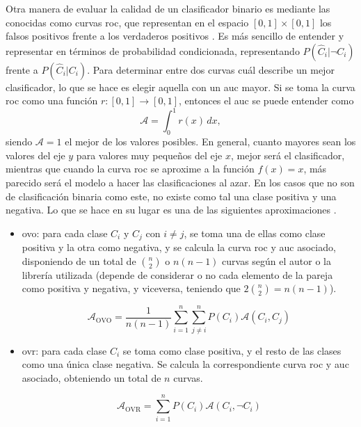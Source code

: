 				Otra manera de evaluar la calidad de un clasificador binario es mediante las conocidas como curvas \gls{roc}, que representan en el espacio $[0, 1]\times[0, 1]$ los falsos positivos frente a los verdaderos positivos \cite{roc}. Es más sencillo de entender y representar en términos de probabilidad condicionada, representando $P(\hat{C}_i | \lnot C_i)$ frente a $P(\hat{C}_i | C_i)$. Para determinar entre dos curvas cuál describe un mejor clasificador, lo que se hace es elegir aquella con un \gls{auc} mayor. Si se toma la curva \gls{roc} como una función $r: [0, 1] \longrightarrow [0, 1]$, entonces el \gls{auc} se puede entender como 
				$$
				\mathcal{A} = \int_0^1 r(x)\,dx, 
				$$
				siendo $\mathcal{A} = 1$ el mejor de los valores posibles. En general, cuanto mayores sean los valores del eje $y$ para valores muy pequeños del eje $x$, mejor será el clasificador, mientras que cuando la curva \gls{roc} se aproxime a la función $f(x) = x$, más parecido será el modelo a hacer las clasificaciones al azar. En los casos que no son de clasificación binaria como este, no existe como tal una clase positiva y una negativa. Lo que se hace en su lugar es una de las siguientes aproximaciones \cite{auc}. 
				
				\begin{itemize}
					\item \gls{ovo}: para cada clase $C_i$ y $C_j$ con $i \neq j$, se toma una de ellas como clase positiva y la otra como negativa, y se calcula la curva \gls{roc} y \gls{auc} asociado, disponiendo de un total de $\binom{n}{2}$ o $n(n-1)$ curvas según el autor o la librería utilizada (depende de considerar o no cada elemento de la pareja como positiva y negativa, y viceversa, teniendo que $2\binom{n}{2} = n(n-1)$). 
					
					$$
					\mathcal{A}_{\text{OVO}} = \frac{1}{n(n-1)}\sum_{i=1}^n\sum_{j \neq i}^n P(C_i)\mathcal{A}(C_i, C_j)
					$$
					
					\item \gls{ovr}: para cada clase $C_i$ se toma como clase positiva, y el resto de las clases como una única clase negativa. Se calcula la correspondiente curva \gls{roc} y \gls{auc} asociado, obteniendo un total de $n$ curvas. 
					
					$$
					\mathcal{A}_{\text{OVR}} = \sum_{i=1}^n P(C_i)\mathcal{A}(C_i, \lnot C_i)
					$$
					
				\end{itemize}
				
